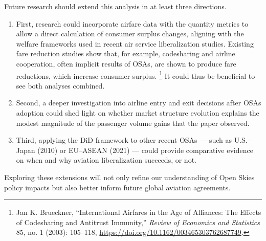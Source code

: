 \documentclass[12pt]{article}
\begin{document}
Future research should extend this analysis in at least three directions.

\begin{enumerate}
    \item First, research could incorporate airfare data with the quantity metrics to allow a direct calculation of consumer surplus changes, aligning with the welfare frameworks used in recent air service liberalization studies. Existing fare reduction studies show that, for example, codesharing and airline cooperation, often implicit results of OSAs, are shown to produce fare reductions, which increase consumer surplus. \footnote{Jan K. Brueckner, “International Airfares in the Age of Alliances: The Effects of Codesharing and Antitrust Immunity,” \textit{Review of Economics and Statistics} 85, no. 1 (2003): 105–118, \url{https://doi.org/10.1162/003465303762687749}.} It could thus be beneficial to see both analyses combined.
    \item Second, a deeper investigation into airline entry and exit decisions after OSAs adoption could shed light on whether market structure evolution explains the modest magnitude of the passenger volume gains that the paper observed.
    \item Third, applying the DiD framework to other recent OSAs — such as U.S.–Japan (2010) or EU–ASEAN (2021) — could provide comparative evidence on when and why aviation liberalization succeeds, or not. 
\end{enumerate}  

Exploring these extensions will not only refine our understanding of Open Skies policy impacts but also better inform future global aviation agreements.
\end{document}
